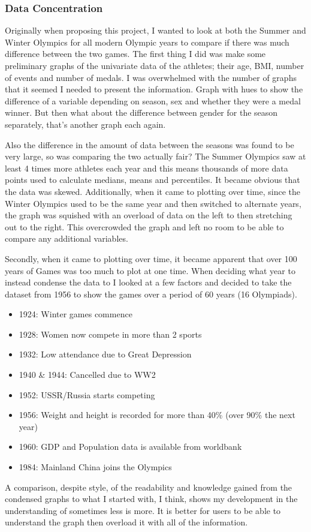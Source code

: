 \documentclass[a4 paper, 12pt]{article}
\begin{document}
        \subsubsection{Data Concentration}
        Originally when proposing this project, I wanted to look at both the Summer and Winter Olympics for all modern Olympic years to compare if there was much difference between the two games. The first thing I did was make some preliminary graphs of the univariate data of the athletes; their age, BMI, number of events and number of medals. I was overwhelmed with the number of graphs that it seemed I needed to present the information. Graph with hues to show the difference of a variable depending on season, sex and whether they were a medal winner. But then what about the difference between gender for the season separately, that's another graph each again. 
        
        Also the difference in the amount of data between the seasons was found to be very large, so was comparing the two actually fair? The Summer Olympics saw at least 4 times more athletes each year and this means thousands of more data points used to calculate medians, means and percentiles. It became obvious that the data was skewed. Additionally, when it came to plotting over time, since the Winter Olympics used to be the same year and then switched to alternate years, the graph was squished with an overload of data on the left to then stretching out to the right. This overcrowded the graph and left no room to be able to compare any additional variables. 

        Secondly, when it came to plotting over time, it became apparent that over 100 years of Games was too much to plot at one time. When deciding what year to instead condense the data to I looked at a few factors and decided to take the dataset from 1956 to show the games over a period of 60 years (16 Olympiads).
            \begin{itemize}
                \item 1924: Winter games commence
                \item 1928: Women now compete in more than 2 sports
                \item 1932: Low attendance due to Great Depression
                \item 1940 \& 1944: Cancelled due to WW2
                \item 1952: USSR/Russia starts competing
                \item 1956: Weight and height is recorded for more than 40\% (over 90\% the next year)
                \item 1960: GDP and Population data is available from worldbank
                \item 1984: Mainland China joins the Olympics
            \end{itemize}
        A comparison, despite style, of the readability and knowledge gained from the condensed graphs to what I started with, I think, shows my development in the understanding of sometimes less is more. It is better for users to be able to understand the graph then overload it with all of the information.  
\end{document}
